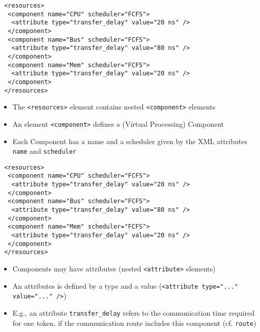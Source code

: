 \begin{frame}[fragile=singleslide]
\begin{lstlisting}
 <resources>
  <component name="CPU" scheduler="FCFS">
   <attribute type="transfer_delay" value="20 ns" />
  </component>
  <component name="Bus" scheduler="FCFS">
   <attribute type="transfer_delay" value="80 ns" />
  </component>
  <component name="Mem" scheduler="FCFS">
   <attribute type="transfer_delay" value="20 ns" />
  </component>
 </resources>
\end{lstlisting}
\begin{itemize}
\item The \lstinline!<resources>! element contains nested \lstinline!<component>! elements
\item An element \lstinline!<component>! defines a (Virtual Processing) Component
\item Each Component has a name and a scheduler given by the XML attributes \lstinline!name! and \lstinline!scheduler!
\end{itemize}
\end{frame}


\begin{frame}[fragile=singleslide]
\begin{lstlisting}
 <resources>
  <component name="CPU" scheduler="FCFS">
   <attribute type="transfer_delay" value="20 ns" />
  </component>
  <component name="Bus" scheduler="FCFS">
   <attribute type="transfer_delay" value="80 ns" />
  </component>
  <component name="Mem" scheduler="FCFS">
   <attribute type="transfer_delay" value="20 ns" />
  </component>
 </resources>
\end{lstlisting}
\begin{itemize}
\item Components may have attributes (nested \lstinline!<attribute>! elements)
\item An attributes is defined by a type and a value (\lstinline!<attribute type="..." value="..." />!)
\item E.g., an attribute \lstinline!transfer_delay! refers to the communication time required for one token, if the communication route includes this component (cf. \lstinline!route!)
\end{itemize}
\end{frame}


